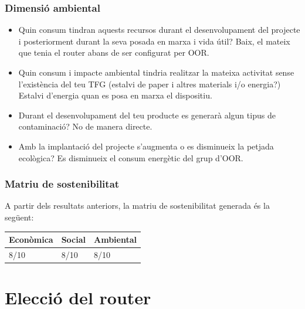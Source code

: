 \documentclass[11pt]{article}
\begin{document}
\subsubsection{Dimensió ambiental}
\begin{itemize}
\item Quin consum tindran aquests recursos durant el desenvolupament del projecte i posteriorment durant la seva posada en marxa i vida útil? Baix, el mateix que tenia el router abans de ser configurat per OOR.
\item Quin consum i impacte ambiental tindria realitzar la mateixa activitat sense l'existència del teu TFG (estalvi de paper i altres materials i/o energia?) Estalvi d’energia quan es posa en marxa el dispositiu.
\item Durant el desenvolupament del teu producte es generarà algun tipus de contaminació? No de manera directe.
\item Amb la implantació del projecte s'augmenta o es disminueix la petjada ecològica? Es disminueix el consum energètic del grup d’OOR.
\end{itemize}
\subsubsection{Matriu de sostenibilitat}
A partir dels resultats anteriors, la matriu de sostenibilitat generada és la següent:
\begin{center}
	\begin{tabular}{| l | l | l |}
		\hline
		Econòmica & Social & Ambiental \\ \hline
		8/10 & 8/10 & 8/10\\ \hline
		\hline
	\end{tabular}
\end{center}

\section{Elecció del router}
\end{document}
